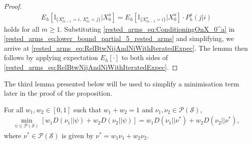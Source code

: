 \begin{proof}
\begingroup\allowdisplaybreaks\begin{align}
E_{h}[\mathbb{I}_{\{X_{m-1}^a=i,\,X_m^a=j\}}|X_0^a]=E_{h}[\mathbb{I}_{\{X_{m-1}^{a}=i\}}|X_0^a]\cdot P_h^a(j|i)\label{rested_arms_eq:ConditioningOnX_0^a}
\end{align}\endgroup
holds for all $m\geq 1$. Substituting \eqref{rested_arms_eq:ConditioningOnX_0^a} in \eqref{rested_arms_eq:lower_bound_partial_5_rested_arms} and simplifying, we arrive at \eqref{rested_arms_eq:RelBtwNijAndNiWithIteratedExpec}. The lemma then follows by applying expectation $E_{h}[\cdot]$ to both sides of \eqref{rested_arms_eq:RelBtwNijAndNiWithIteratedExpec}.	
\end{proof}

The third lemma presented below will be used to simplify a minimisation term later in the proof of the proposition.
 \begin{lemma}
 \label{rested_arms_lemma:convex_comb_of_KL_div}
	For all $w_1,w_2\in[0,1]$ such that $w_1+w_2=1$ and $\nu_1, \nu_2\in \mathcal{P}(\mathcal{S})$, 
 	\begingroup\allowdisplaybreaks\begin{align}
 		\min\limits_{\psi\in\mathcal{P}(\mathcal{S})}\left[w_1 D(\nu_1||\psi)+w_2 D(\nu_2||\psi)\right]
 		=w_1 D(\nu_1||\nu^*)+w_2 D(\nu_2||\nu^*),\label{rested_arms_eq:convex_comb_of_KL_div}
 	\end{align}\endgroup
 	where $\nu^*\in\mathcal{P}(\mathcal{S})$ is given by $\nu^*=w_1\nu_1+w_2\nu_2$.
 \end{lemma}
